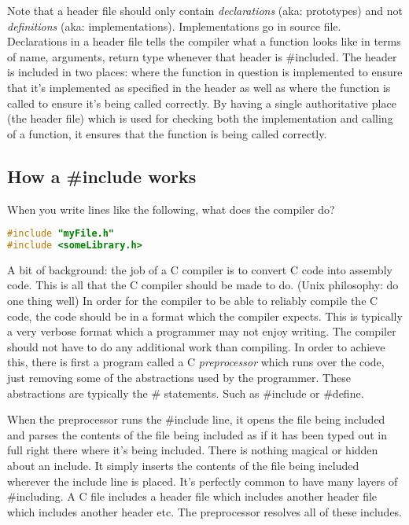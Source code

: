 Note that a header file should only contain \emph{declarations} (aka: prototypes) and not \emph{definitions} (aka: implementations). Implementations go in source file.
Declarations in a header file tells the compiler what a function looks like in terms of name, arguments, return type whenever that header is \#included. 
The header is included in two places: where the function in question is implemented to ensure that it's implemented as specified in the header as well as where the function is called to ensure it's being called correctly.
By having a single authoritative place (the header file) which is used for checking both the implementation and calling of a function, it ensures that the function is being called correctly.

\subsection{How a \#include works}
When you write lines like the following, what does the compiler do?
\begin{lstlisting}[language=C]
#include "myFile.h"
#include <someLibrary.h>
\end{lstlisting}

A bit of background: the job of a C compiler is to convert C code into assembly code. This is all that the C compiler should be made to do. (Unix philosophy: do one thing well)
In order for the compiler to be able to reliably compile the C code, the code should be in a format which the compiler expects. 
This is typically a very verbose format which a programmer may not enjoy writing.
The compiler should not have to do any additional work than compiling.
In order to achieve this, there is first a program called a C \emph{preprocessor} which runs over the code, just removing some of the abstractions used by the programmer. 
These abstractions are typically the \# statements. Such as \#include or \#define.

When the preprocessor runs the \#include line, it opens the file being included and parses the contents of the file being included as if it has been typed out in full right there where it's being included.
There is nothing magical or hidden about an include. It simply inserts the contents of the file being included wherever the include line is placed. It's perfectly common to have many layers of \#including. A C file includes a header file which includes another header file which includes another header etc. The preprocessor resolves all of these includes.\\

